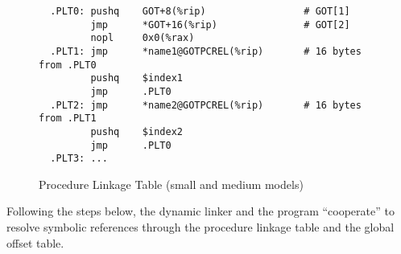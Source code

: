 \begin{figure}[H]
\Hrule
\caption{Procedure Linkage Table (small and medium models)}
\label{small_med_plt}
\begin{footnotesize}
\begin{verbatim}
  .PLT0: pushq    GOT+8(%rip)                 # GOT[1]
         jmp      *GOT+16(%rip)               # GOT[2]
         nopl     0x0(%rax)
  .PLT1: jmp      *name1@GOTPCREL(%rip)       # 16 bytes from .PLT0
         pushq    $index1
         jmp      .PLT0
  .PLT2: jmp      *name2@GOTPCREL(%rip)       # 16 bytes from .PLT1
         pushq    $index2
         jmp      .PLT0
  .PLT3: ...
\end{verbatim}%
\end{footnotesize}
\Hrule
\end{figure}

Following the steps below, the dynamic linker and the program
``cooperate'' to resolve symbolic references through the procedure
linkage table and the global offset table.

